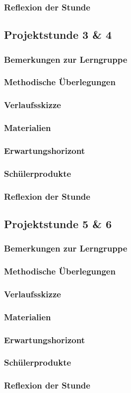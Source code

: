 \subsubsection{Reflexion der Stunde}
\newpage
\subsection{Projektstunde 3 \& 4}\ellen
\subsubsection{Bemerkungen zur Lerngruppe}
\subsubsection{Methodische Überlegungen}
\subsubsection{Verlaufsskizze}
\subsubsection{Materialien}
\subsubsection{Erwartungshorizont}
\subsubsection{Schülerprodukte}
\subsubsection{Reflexion der Stunde}
\newpage
\subsection{Projektstunde 5 \& 6}\steffen
\subsubsection{Bemerkungen zur Lerngruppe}
\subsubsection{Methodische Überlegungen}
\subsubsection{Verlaufsskizze}
\subsubsection{Materialien}
\subsubsection{Erwartungshorizont}
\subsubsection{Schülerprodukte}
\subsubsection{Reflexion der Stunde}